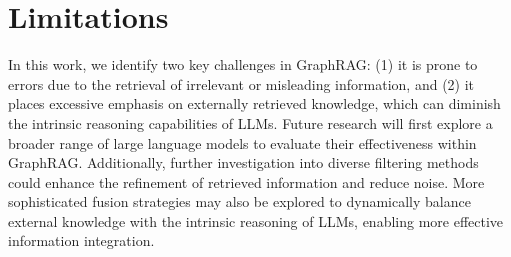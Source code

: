 \documentclass[11pt]{article}
\begin{document}
\section*{Limitations}
In this work, we identify two key challenges in GraphRAG: (1) it is prone to errors due to the retrieval of irrelevant or misleading information, and (2) it places excessive emphasis on externally retrieved knowledge, which can diminish the intrinsic reasoning capabilities of LLMs. Future research will first explore a broader range of large language models to evaluate their effectiveness within GraphRAG. Additionally, further investigation into diverse filtering methods could enhance the refinement of retrieved information and reduce noise. More sophisticated fusion strategies may also be explored to dynamically balance external knowledge with the intrinsic reasoning of LLMs, enabling more effective information integration.




\end{document}
